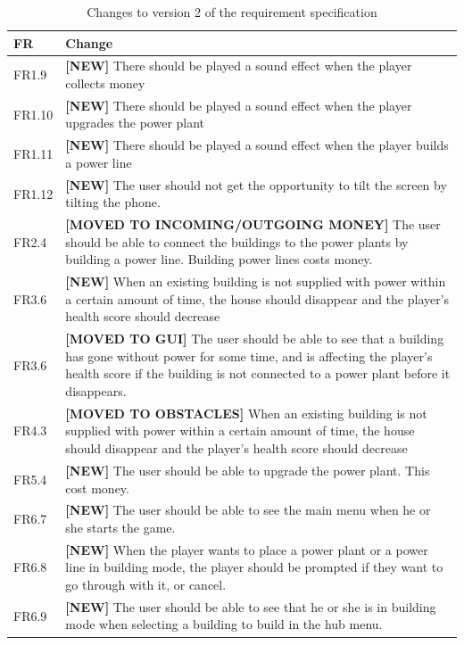 	\begin{table}[H]
	\begin{tabular}{| p{1.5cm} | p{12cm} |}
		\hline
		\rowcolor{lightgray}
		{\bf FR} & {\bf Change} \\ \hline
		FR1.9 & {\bf \color{green} [NEW]} There should be played a sound effect when 
		the player collects money \\ \hline
		FR1.10 & {\bf \color{green} [NEW]} There should be played a sound effect when 
		the player upgrades the power plant \\ \hline
		FR1.11 & {\bf \color{green} [NEW]} There should be played a sound effect when 
		the player builds a power line\\ \hline
		FR1.12 & {\bf \color{green} [NEW]} The user should not get the opportunity to 
		tilt the screen by tilting the phone. \\ \hline
		FR2.4 & {\bf \color{orange} [MOVED TO INCOMING/OUTGOING MONEY]} The user should 
		be able to connect the buildings to the power plants by building a power line. 
		Building power lines costs money. \\ \hline
		FR3.6 & {\bf \color{green} [NEW]} When an existing building is not supplied 
		with power within a certain amount of time, the house should disappear and the player's 
		health score should decrease \\ \hline
		FR3.6 & {\bf \color{orange} [MOVED TO GUI]} The user should be able to see 
		that a building has gone without power for some time, and is affecting the 
		player's health score if the building is not connected to a power plant before it 
		disappears. \\ \hline
		FR4.3 & {\bf \color{orange} [MOVED TO OBSTACLES]} When an existing building 
		is not supplied with power within a certain amount of time, the house should 
		disappear and the player's health score should decrease \\ \hline
		FR5.4 & {\bf \color{green} [NEW]} The user should be able to upgrade the power plant. 
		This cost money. \\ \hline
		FR6.7 & {\bf \color{green} [NEW]} The user should be able to see the main 
		menu when he or she starts the game. \\ \hline
		FR6.8 & {\bf \color{green} [NEW]} When the player wants to place a power plant 
		or a power line in building mode, the player should be prompted if they want to 
		go through with it, or cancel. \\ \hline
		FR6.9 & {\bf \color{green} [NEW]} The user should be able to see that he or she 
		is in building mode when selecting a building to build in the hub menu. \\ \hline
	\end{tabular}
	\caption{Changes to version 2 of the requirement specification}
	\end{table}
	
